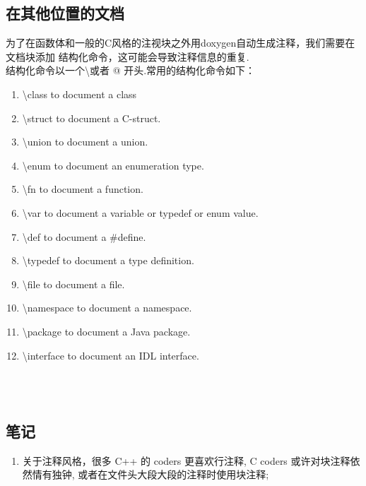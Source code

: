 \documentclass[a4paper,11pt,CJK]{article}
\begin{document}
\begin{CJK}{UTF8}{gbsn}
\subsection{在其他位置的文档}
为了在函数体和一般的C风格的注视块之外用doxygen自动生成注释，我们需要在文档块添加
结构化命令，这可能会导致注释信息的重复.\\
结构化命令以一个\textbackslash 或者 @ 开头.常用的结构化命令如下：
\begin{enumerate}
\item[\labelitemi]\textbackslash class to document a class
\item[\labelitemi]\textbackslash struct to document a C-struct.
\item[\labelitemi]\textbackslash union to document a union.
\item[\labelitemi]\textbackslash enum to document an enumeration type.
\item[\labelitemi]\textbackslash fn to document a function.
\item[\labelitemi]\textbackslash var to document a variable or typedef or enum value.
\item[\labelitemi]\textbackslash def to document a \#define.
\item[\labelitemi]\textbackslash typedef to document a type definition.
\item[\labelitemi]\textbackslash file to document a file.
\item[\labelitemi]\textbackslash namespace to document a namespace.
\item[\labelitemi]\textbackslash package to document a Java package.
\item[\labelitemi]\textbackslash interface to document an IDL interface.
\end{enumerate}
\\
\\
\subsection{笔记}
\begin{enumerate}
    \item 关于注释风格，很多 C++ 的 coders 更喜欢行注释, C coders 或许对块注释依然情有独钟, 或者在文件头大段大段的注释时使用块注释;


\end{enumerate}
\end{CJK}
\end{document}
